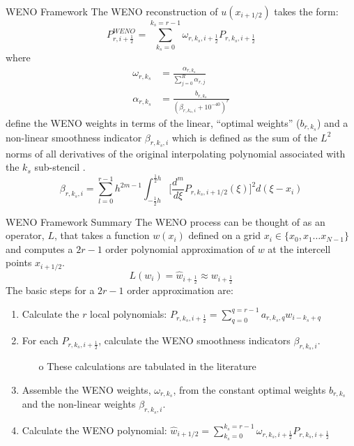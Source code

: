 \documentclass[9pt]{beamer}
\begin{document}
\begin{frame}{WENO Framework}
  The WENO reconstruction of $u(x_{i+1/2})$ takes the form:
  \begin{equation}
    P^{WENO}_{r,i+\frac{1}{2}}=\sum_{k_s=0}^{k_s=r-1}\omega_{r,k_s,i+\frac{1}{2}}P_{r,k_s,i+\frac{1}{2}}\label{eq:WenoEquation}
  \end{equation}
  where 
  \begin{align}
    \omega_{r,k_s}&=\frac{\alpha_{r,k_s}}{\sum_{j=0}^R\alpha_{r,j}}\\
    \alpha_{r,k_s}&=\frac{b_{r,k_s}}{(\beta_{r,k_s,i} +10^{-40})^r}
  \end{align}
  define the WENO weights in terms of the linear, ``optimal weights'' ($b_{r,k_s}$) and a non-linear smoothness indicator $\beta_{r,k_s,i}$ which is defined as the sum of the $L^2$ norms of all derivatives of the original interpolating polynomial associated with the $k_s$ sub-stencil \cite{Jiang96}. 
  \begin{equation}
    \beta_{r,k_s,i} = \sum_{l=0}^{r-1}h^{2m-1}\int_{-\frac{1}{2}h}^{\frac{1}{2}h}\bigg[\frac{d^m}{d\xi}P_{r,k_s,i+1/2}(\xi)\bigg]^2d(\xi-x_i)\label{eq:OptimalCoefficients}
  \end{equation}
\end{frame}

\begin{frame}{WENO Framework Summary}
  The WENO process can be thought of as an operator, $L$, that takes a function $w(x_i)$ defined on a grid $x_i \in \{x_0, x_1 \dots x_{N-1}
  \}$ and computes a $2r-1$ order polynomial approximation of $w$ at the intercell points $x_{i+1/2}$.
  $$L(w_{i}) = \hat{w}_{{i+\frac{1}{2}}}\approx w_{{i+\frac{1}{2}}}$$
  The basic steps for a $2r-1$ order approximation are:
  \begin{enumerate}
    \item Calculate the $r$ local polynomials: $P_{r,k_s,i+\frac{1}{2}}= \sum_{q=0}^{q=r-1}a_{r,k_s,q}w_{i-k_s+q}$
    \item For each $P_{r,k_s,i+\frac{1}{2}}$, calculate the WENO smoothness indicators $\beta_{r,k_s,i}$.
    \begin{itemize}
      \item[o] These calculations are tabulated in the literature
    \end{itemize}
    \item Assemble the WENO weights, $\omega_{r,k_s}$, from the constant optimal weights $b_{r,k_s}$ and the non-linear weights $\beta_{r,k_s,i}$. 
    \item Calculate the WENO polynomial: $\hat{w}_{i+1/2}=\sum_{k_s=0}^{k_s=r-1}\omega_{r,k_s,i+\frac{1}{2}}P_{r,k_s,i+\frac{1}{2}}$
  \end{enumerate}
\end{frame}
\end{document}
